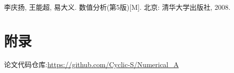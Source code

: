 \begin{thebibliography}{99}
	李庆扬, 王能超, 易大义. 数值分析(第5版)[M]. 北京: 清华大学出版社, 2008.
\end{thebibliography}
\section*{附录}
论文代码仓库:\quad \href{https://github.com/Cyclic-S/Numerical_A}{https://github.com/Cyclic-S/Numerical\_A}
